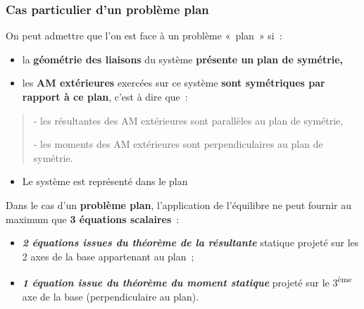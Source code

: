 \hypertarget{cas-particulier-dun-probluxe8me-plan}{%
\subsubsection{Cas particulier d'un problème plan}\label{cas-particulier-dun-probluxe8me-plan}}

On peut admettre que l'on est face à un problème «~plan~» si~:

\begin{itemize}
\item
  la \textbf{géométrie des liaisons} du système \textbf{présente un} \textbf{plan de symétrie,}
\item
  les \textbf{AM extérieures} exercées sur ce système \textbf{sont symétriques par rapport à ce plan}, c'est à dire que~:
\end{itemize}

\begin{quote}
- les résultantes des AM extérieures sont parallèles au plan de symétrie,

- les moments des AM extérieures sont perpendiculaires au plan de symétrie.
\end{quote}

\begin{itemize}
\tightlist
\item
  Le système est représenté dans le plan
\end{itemize}

Dans le cas d'un \textbf{problème plan}, l'application de l'équilibre ne peut fournir au maximum que \textbf{3 équations scalaires}~:

\begin{itemize}
\item
  \textbf{\emph{2 équations issues du théorème de la résultante}} statique projeté sur les 2 axes de la base appartenant au plan~;
\item
  \textbf{\emph{1 équation issue du théorème du moment statique}} projeté sur le 3\textsuperscript{ème} axe de la base (perpendiculaire au plan).
\end{itemize}


